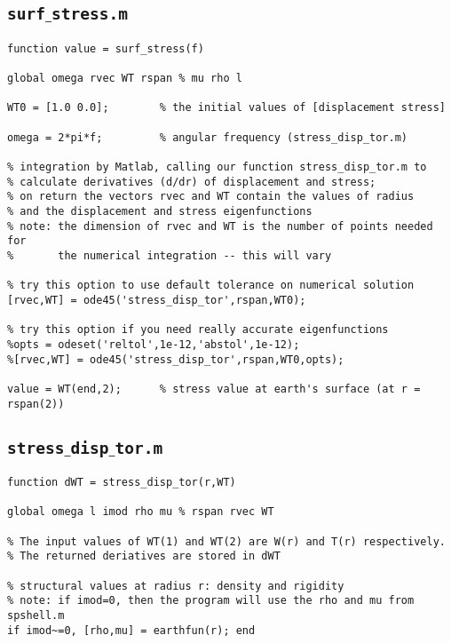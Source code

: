 \documentclass[11pt,titlepage,fleqn]{article}
\begin{document}
\begin{spacing}{1.0}

\subsection{\tt surf$\_$stress.m}
\label{sec:surf}

\small
\begin{verbatim}
function value = surf_stress(f)

global omega rvec WT rspan % mu rho l

WT0 = [1.0 0.0];        % the initial values of [displacement stress]

omega = 2*pi*f;         % angular frequency (stress_disp_tor.m)

% integration by Matlab, calling our function stress_disp_tor.m to
% calculate derivatives (d/dr) of displacement and stress;
% on return the vectors rvec and WT contain the values of radius
% and the displacement and stress eigenfunctions
% note: the dimension of rvec and WT is the number of points needed for
%       the numerical integration -- this will vary

% try this option to use default tolerance on numerical solution
[rvec,WT] = ode45('stress_disp_tor',rspan,WT0);

% try this option if you need really accurate eigenfunctions
%opts = odeset('reltol',1e-12,'abstol',1e-12);
%[rvec,WT] = ode45('stress_disp_tor',rspan,WT0,opts);

value = WT(end,2);      % stress value at earth's surface (at r = rspan(2))
\end{verbatim}
\normalsize


\pagebreak
\subsection{\tt stress$\_$disp$\_$tor.m}
\label{sec:stress}

\small
\begin{verbatim}
function dWT = stress_disp_tor(r,WT)

global omega l imod rho mu % rspan rvec WT

% The input values of WT(1) and WT(2) are W(r) and T(r) respectively.
% The returned deriatives are stored in dWT

% structural values at radius r: density and rigidity
% note: if imod=0, then the program will use the rho and mu from spshell.m
if imod~=0, [rho,mu] = earthfun(r); end


\end{verbatim}
\end{spacing}
\end{document}
